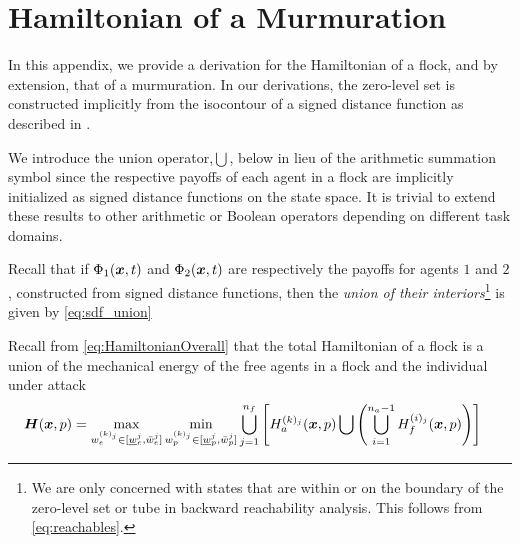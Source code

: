 \section{Hamiltonian of a Murmuration}
\label{app:ham}

In this appendix, we provide a derivation for the Hamiltonian of a flock, and by extension, that of a murmuration. In our derivations, the zero-level set is constructed implicitly from the  isocontour of a signed distance function as described in \cite[Chapter II]{LevelSetsBook}. 

We introduce the union operator,$\bigcup$, below in lieu of the arithmetic summation symbol since the respective payoffs of each agent in a flock are implicitly initialized as signed distance functions on the state space. It is trivial to extend these results to other arithmetic or Boolean operators depending on different task domains. 

Recall that if $\Phi_1(\bm{x}, t)$ and $\Phi_2(\bm{x}, t)$ are respectively the payoffs for agents $1$ and $2$, constructed from signed distance functions, then the \textit{union of their interiors}\footnote{We are only concerned with states that are within or on the boundary of the zero-level set or tube in backward reachability analysis. This follows from \eqref{eq:reachables}.} is given by \eqref{eq:sdf_union}
%

Recall from \eqref{eq:HamiltonianOverall} 
that the total Hamiltonian of a flock is a union of the mechanical energy of the free agents in a flock and the individual under attack \ie
%
\begin{align}
	\bm{H}(\bm{x}, p) &= \max_{w_e^{(k)_j} \in [\underline{w}_e^j, \bar{w}_e^j]}  \min_{w_p^{(k)_j}  \in [\underline{w}_p^{j}, \bar{w}_p^j]} \bigcup_{j=1}^{n_f} \left[ H^{(k)_j}_a(\bm{x}, p) \bigcup \left( \bigcup_{i=1}^{n_a-1} H^{(i)_j}_f(\bm{x}, p) \right) \right] 
\end{align}

